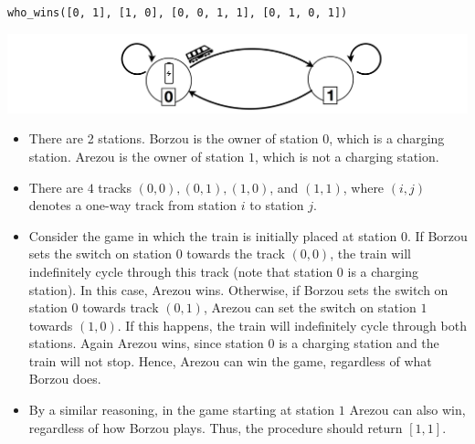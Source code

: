 \texttt{who\_wins([0, 1], [1, 0], [0, 0, 1, 1], [0, 1, 0, 1])}

\includegraphics{train.png}

\begin{itemize}
\item There are 2 stations.
Borzou is the owner of station $0$, which is a charging station.
Arezou is the owner of station $1$, which is not a charging station.
\item There are $4$ tracks $(0, 0), (0, 1), (1, 0)$, and $(1, 1)$, where $(i, j)$ denotes a one-way track from station $i$ to station $j$.
\item Consider the game in which the train is initially placed at station $0$.
If Borzou sets the switch on station $0$ towards the track $(0, 0)$, the train will indefinitely cycle through this track (note that station $0$ is a charging station).
In this case, Arezou wins.
Otherwise, if Borzou sets the switch on station $0$ towards track $(0, 1)$, Arezou can set the switch on station $1$ towards $(1, 0)$.
If this happens, the train will indefinitely cycle through both stations. Again Arezou wins, since station $0$ is a charging station and the train will not stop.
Hence, Arezou can win the game, regardless of what Borzou does.
\item By a similar reasoning, in the game starting at station $1$ Arezou can also win, regardless of how Borzou plays. Thus, the procedure should return $[1, 1]$.
\end{itemize}
